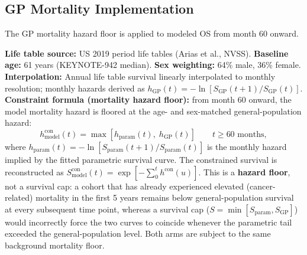 \documentclass[11pt,a4paper]{article}
\begin{document}
\subsection{GP Mortality Implementation}
\label{sec:gp_impl}
The GP mortality hazard floor is applied to modeled OS from month 60 onward.

\textbf{Life table source:} US 2019 period life tables (Arias et al., NVSS).
\textbf{Baseline age:} 61 years (\mbox{KEYNOTE-942} median). \textbf{Sex weighting:} 64\% male, 36\% female.
\textbf{Interpolation:} Annual life table survival linearly interpolated to monthly resolution; monthly hazards derived as $h_{\text{GP}}(t) = -\ln[S_{\text{GP}}(t{+}1)/S_{\text{GP}}(t)]$.
\textbf{Constraint formula (mortality hazard floor):} from month 60 onward, the model mortality hazard is floored at the age- and sex-matched general-population hazard:
\begin{equation}
    h_{\text{model}}^{\text{con}}(t) = \max\left[h_{\text{param}}(t),\; h_{\text{GP}}(t)\right] \qquad t \geq 60 \text{ months},
\end{equation}
where $h_{\text{param}}(t) = -\ln[S_{\text{param}}(t{+}1)/S_{\text{param}}(t)]$ is the monthly hazard implied by the fitted parametric survival curve. The constrained survival is reconstructed as $S_{\text{model}}^{\text{con}}(t) = \exp[-\sum_{0}^{t} h^{\text{con}}(u)]$. This is a \textbf{hazard floor}, not a survival cap: a cohort that has already experienced elevated (cancer-related) mortality in the first 5 years remains below general-population survival at every subsequent time point, whereas a survival cap ($S = \min[S_{\text{param}}, S_{\text{GP}}]$) would incorrectly force the two curves to coincide whenever the parametric tail exceeded the general-population level. Both arms are subject to the same background mortality floor.
\end{document}
